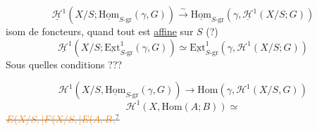 \[
\boxed{\underline{\mathscr H}^{1}(X/S;\underline{\mathrm{Hom}}_{S\text{-}\mathrm{gr}}(\gamma,G))\mathrel{\overset{\sim}{\longrightarrow}}\underline{\mathrm{Hom}}_{S\text{-}\mathrm{gr}}(\gamma,\underline{\mathscr H}^{1}(X/S;G))}
\]
isom de foncteurs,  quand tout est \uline{affine} sur $S$ (?)
\[
\boxed{\underline{\mathscr H}^{1}(X/S;\underline{\mathrm{Ext}}^{1}_{S\text{-}\mathrm{gr}}(\gamma,G))\simeq\underline{\mathrm{Ext}}^{1}_{S\text{-}\mathrm{gr}}(\gamma,\mathscr H^{1}(X/S;G))}
\]
Sous quelles conditions ???

\[
\mathscr H^1(X/S,\underline{\mathrm{Hom}}_{S\text{-}\mathrm{gr}}(\gamma,G))\longrightarrow\mathrm{Hom}(\gamma,\mathscr H^1(X/S,G))
\]
\[
\mathscr H^1(X,\mathrm{Hom}(A;B))\simeq
\]
$\deleted{\unsure{E(X/S,|F(X/S,|E(A,B,}}$
